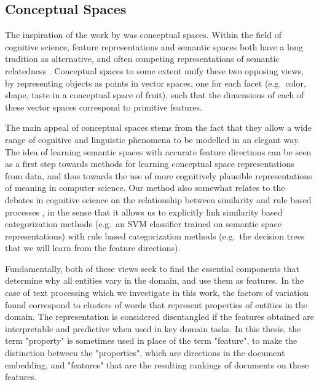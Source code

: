 \subsection{Conceptual Spaces}

The inspiration of the work by  \cite{Derrac2015} was conceptual spaces. Within the field of cognitive science, feature representations and semantic spaces both have a long tradition as alternative, and often competing representations of semantic relatedness \cite{tversky1977features}. Conceptual spaces \cite{gardenfors2004conceptual} to some extent unify these two opposing views, by representing objects as points in vector spaces, one for each facet (e.g.\ color, shape, taste in a conceptual space of fruit), such that the dimensions of each of these vector spaces correspond to primitive features. %

The main appeal of conceptual spaces stems from the fact that they allow a wide range of cognitive and linguistic phenomena to be modelled in an elegant way. The idea of learning semantic spaces with accurate feature directions can be seen as a first step towards methods for learning conceptual space representations from data, and thus towards the use of more cognitively plausible representations of meaning in computer science. Our method also somewhat relates to the debates in cognitive science on the relationship between similarity and rule based processes  \cite{HAHN1998197}, in the sense that it allows us to explicitly link similarity based categorization methods (e.g.\ an SVM classifier trained on semantic space representations) with rule based categorization methods (e.g.\ the decision trees that we will learn from the feature directions).

Fundamentally, both of these views seek to find the essential components that determine why all entities vary in the domain, and use them as features. In the case of text processing which we investigate in this work, the factors of variation found correspond to clusters of words that represent properties of entities in the domain. The representation is considered disentangled if the features obtained are interpretable and  predictive when used in key domain tasks. In this thesis, the term "property" is sometimes used in place of the term "feature", to make the distinction between the "properties", which are directions in the document embedding, and "features"  that are the resulting rankings of documents on those features. 


